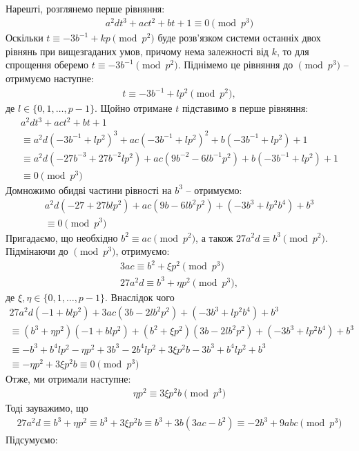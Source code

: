 \documentclass{thesis}
\begin{document}
Нарешті, розглянемо перше рівняння:
\begin{align*}
a^2 dt^3 + act^2 + bt + 1 \equiv 0 \pmod {p^3}
\end{align*}
Оскільки $t \equiv -3b^{-1} + kp \pmod {p^2}$ буде розв'язком системи останніх двох рівнянь при вищезгаданих умов, причому нема залежності від $k$, то для спрощення оберемо $t \equiv -3b^{-1} \pmod {p^2}$. Піднімемо це рівняння до $\pmod {p^3}$ -- отримуємо наступне:
\begin{align*}
t \equiv -3b^{-1} + lp^2 \pmod {p^2},
\end{align*} 
де $l \in \{0,1,\dots,p-1\}$. Щойно отримане $t$ підставимо в перше рівняння:
\begin{multline*}
a^2 dt^3 + act^2 + bt + 1 \\ 
\equiv a^2 d (-3b^{-1} + lp^2)^3 + ac(-3b^{-1} + lp^2)^2 + b(-3b^{-1} + lp^2) + 1 \\
\equiv a^2d (-27b^{-3} + 27b^{-2} lp^2) + ac (9b^{-2} - 6 l b^{-1} p^2) + b (-3b^{-1} + lp^2) + 1 \\ 
\equiv 0 \pmod {p^3}
\end{multline*}
Домножимо обидві частини рівності на $b^3$ -- отримуємо:
\begin{multline*}
a^2d (-27 + 27b lp^2) + ac (9b - 6 l b^2 p^2) + (-3 b^3 + lp^2 b^4) + b^3 \\ 
\equiv 0 \pmod {p^3}
\end{multline*}
Пригадаємо, що необхідно $b^2 \equiv ac \pmod {p^2}$, а також $27a^2 d \equiv b^3 \pmod {p^2}$. Підмінаючи до $\pmod {p^3}$, отримуємо:
\begin{align*}
3ac \equiv b^2 + \xi p^2 \pmod {p^3} \\
27a^2 d \equiv b^3 + \eta p^2 \pmod {p^3},
\end{align*}
де $\xi,\eta \in \{0,1,\dots,p-1\}$. Внаслідок чого
\begin{multline*}
27 a^2d (-1+ b lp^2) + 3ac (3b - 2 l b^2 p^2) + (-3 b^3 + lp^2 b^4) + b^3 \\ \equiv (b^3 + \eta p^2)(-1 + b lp^2) + (b^2 + \xi p^2)(3b - 2 l b^2 p^2) + (-3 b^3 + lp^2 b^4) + b^3 \\ \equiv -b^3 + b^4 lp^2 - \eta p^2 + 3b^3 - 2b^4 lp^2 + 3 \xi p^2 b - 3b^3 + b^4 lp^2 + b^3 \\
\equiv - \eta p^2 + 3\xi p^2 b \equiv 0 \pmod {p^3}
\end{multline*}
Отже, ми отримали наступне:
\begin{align*}
\eta p^2 \equiv 3 \xi p^2 b \pmod {p^3}
\end{align*}
Тоді зауважимо, що
\begin{align*}
27 a^2 d \equiv b^3 + \eta p^2 \equiv b^3 + 3 \xi p^2 b \equiv b^3 + 3b(3ac - b^2) \equiv -2b^3 + 9abc \pmod {p^3}
\end{align*}
Підсумуємо:
\end{document}
